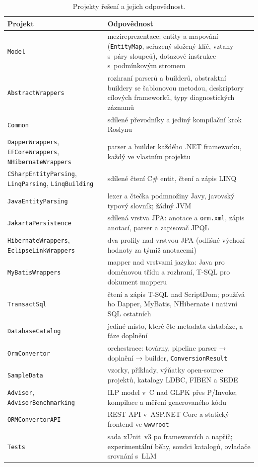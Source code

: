 \documentclass{article}
\begin{document}
\begin{table}[ht]
\centering\small
\begin{tabularx}{\textwidth}{L{4.3cm} Y}
\toprule
\textbf{Projekt} & \textbf{Odpovědnost} \\
\midrule
\texttt{Model} & mezireprezentace: entity a mapování (\texttt{EntityMap}, seřazený složený klíč, vztahy s~páry sloupců), dotazové instrukce s~podmínkovým stromem \\
\texttt{AbstractWrappers} & rozhraní parserů a builderů, abstraktní buildery se šablonovou metodou, deskriptory cílových frameworků, typy diagnostických záznamů \\
\texttt{Common} & sdílené převodníky a jediný kompilační krok Roslynu \\
\texttt{DapperWrappers}, \texttt{EFCoreWrappers}, \texttt{NHibernateWrappers} & parser a builder každého .NET frameworku, každý ve vlastním projektu \\
\texttt{CSharpEntityParsing}, \texttt{LinqParsing}, \texttt{LinqBuilding} & sdílené čtení C\# entit, čtení a zápis LINQ \\
\texttt{JavaEntityParsing} & lexer a čtečka podmnožiny Javy, javovský typový slovník; žádný JVM \\
\texttt{JakartaPersistence} & sdílená vrstva JPA: anotace a \texttt{orm.xml}, zápis anotací, parser a zapisovač JPQL \\
\texttt{HibernateWrappers}, \texttt{EclipseLinkWrappers} & dva profily nad vrstvou JPA (odlišné výchozí hodnoty za týmiž anotacemi) \\
\texttt{MyBatisWrappers} & mapper nad vrstvami jazyka: Java pro doménovou třídu a rozhraní, T-SQL pro dokument mapperu \\
\texttt{TransactSql} & čtení a zápis T-SQL nad ScriptDom; používá ho Dapper, MyBatis, NHibernate i nativní SQL ostatních \\
\texttt{DatabaseCatalog} & jediné místo, které čte metadata databáze, a fáze doplnění \\
\texttt{OrmConvertor} & orchestrace: továrny, pipeline parser → doplnění → builder, \texttt{ConversionResult} \\
\texttt{SampleData} & vzorky, příklady, výňatky open-source projektů, katalogy LDBC, FIBEN a SEDE \\
\texttt{Advisor}, \texttt{AdvisorBenchmarking} & ILP model v~C nad GLPK přes P/Invoke; kompilace a měření generovaného kódu \\
\texttt{ORMConvertorAPI} & REST API v~ASP.NET Core a statický frontend ve \texttt{wwwroot} \\
\texttt{Tests} & sada xUnit~v3 po frameworcích a napříč; experimentální běhy, soudci katalogů, ovladače srovnání s~LLM \\
\bottomrule
\end{tabularx}
\caption{Projekty řešení a jejich odpovědnost.}
\label{tab:projekty}
\end{table}
\end{document}
